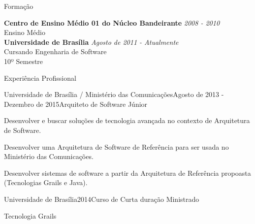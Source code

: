 \documentclass{resume} %
\begin{document}

\begin{rSection}{Formação}

{\bf Centro de Ensino Médio 01 do Núcleo Bandeirante} \hfill {\em 2008 - 2010} \\ 
Ensino Médio \\

{\bf Universidade de Brasília} \hfill {\em Agosto de 2011 - Atualmente} \\ 
Cursando Engenharia de Software \\
10º Semestre \\

\end{rSection}


\begin{rSection}{Experiência Profissional}

\begin{rSubsection}{Universidade de Brasília / Ministério das Comunicações}{Agosto de 2013 - Dezembro de 2015}{Arquiteto de Software Júnior}{}
\item Desenvolver e buscar soluções de tecnologia avançada no contexto de Arquitetura de
Software.
\item Desenvolver uma Arquitetura de Software de Referência para ser usada no Ministério
das Comunicações.
\item Desenvolver sistemas de software a partir da Arquitetura de Referência propoasta (Tecnologias Grails e Java).
\end{rSubsection}


\begin{rSubsection}{Universidade de Brasília}{2014}{Curso de Curta duração Ministrado}{}
\item Tecnologia Grails
\end{rSubsection}

\end{rSection}

\end{document}
